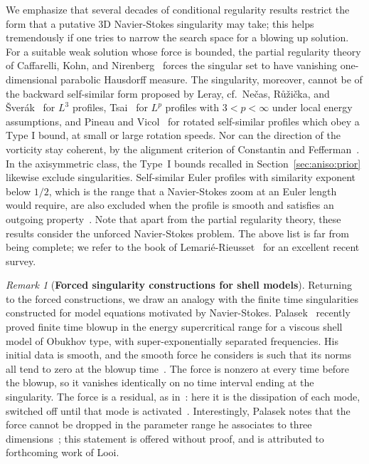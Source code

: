 \documentclass[11pt,reqno]{amsproc}
\numberwithin{equation}{section}
\theoremstyle{remark}
\newtheorem{remark}[theorem]{Remark}
\begin{document}
We emphasize that several decades of conditional regularity results restrict the form that a putative 3D Navier-Stokes singularity may take; this helps tremendously if one tries to narrow the search space for a blowing up solution. For a suitable weak solution whose force is bounded, the partial regularity theory of Caffarelli, Kohn, and Nirenberg~\cite{CKN} forces the singular set to have vanishing one-dimensional parabolic Hausdorff measure. The singularity, moreover, cannot be of the backward self-similar form proposed by Leray, cf.~Ne\v{c}as, R\r{u}\v{z}i\v{c}ka, and \v{S}ver\'ak~\cite{NRS96} for $L^3$ profiles, Tsai~\cite{Tsai98} for $L^p$ profiles with $3<p<\infty$ under local energy assumptions, and Pineau and Vicol~\cite{PineauVicol26} for rotated self-similar profiles which obey a Type I bound, at small or large rotation speeds. Nor can the direction of the vorticity stay coherent, by the alignment criterion of Constantin and Fefferman~\cite{ConstantinFefferman93}. In the axisymmetric class, the Type~I bounds recalled in Section~\ref{sec:aniso:prior} likewise exclude singularities. Self-similar Euler profiles with similarity exponent below $1/2$, which is the range that a Navier-Stokes zoom at an Euler length would require, are also excluded when the profile is smooth and satisfies an outgoing property~\cite{CIV26}. Note that apart from the partial regularity theory, these results consider the unforced Navier-Stokes problem. The above list is far from being complete; we refer to the book of Lemari\'e-Rieusset~\cite{LemarieRieusset16} for an excellent recent survey. 

\begin{remark}[{\bf Forced singularity constructions for shell models}]
\label{rem:shell:models}
Returning to the forced constructions, we draw an analogy with the finite time singularities constructed for model equations motivated by Navier-Stokes. Palasek~\cite[Theorem~1.3 and Remark~1.5]{Palasek26} recently proved finite time blowup in the energy supercritical range for a viscous shell model of Obukhov type, with super-exponentially separated frequencies. His initial data is smooth, and the smooth force he considers is such that its norms all tend to zero at the blowup time~\cite[Remark~1.4]{Palasek26}. The force is nonzero at every time before the blowup, so it vanishes identically on no time interval ending at the singularity. The force is a residual, as in~\cite{OpenAIManuscript}: here it is the dissipation of each mode, switched off until that mode is activated~\cite[Section~3.3]{Palasek26}. Interestingly, Palasek notes that the force cannot be dropped in the parameter range he associates to three dimensions~\cite[Remark~1.4 and Section~1.3.2]{Palasek26}; this statement is offered without proof, and is attributed to forthcoming work of Looi.
\end{remark}
\end{document}
